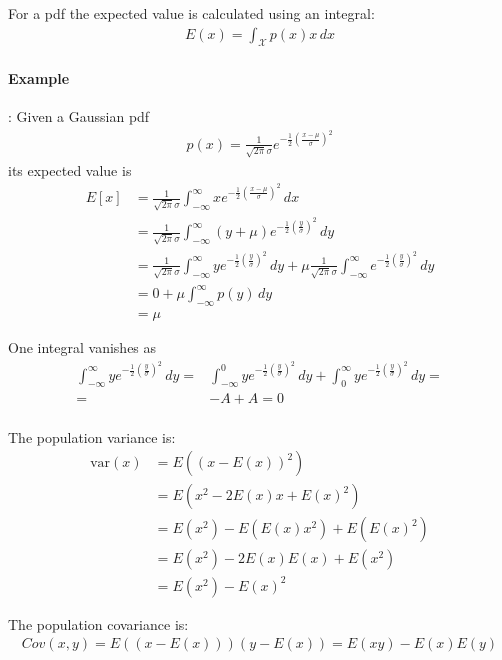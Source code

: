 For a pdf the expected value is calculated using an integral:
\begin{align}
  E(x)=\int_{\mathcal{X}}p(x)x \,dx 
\end{align}

\paragraph{Example}: Given a Gaussian pdf
\begin{align}
  p(x)= \frac{1}{\sqrt{2\pi}\sigma} e^{-\frac{1}{2}\left(\frac{x-\mu}{\sigma}\right)^2}  
\end{align}
its expected value is
\begin{align}
   E[x] &= \frac{1}{\sqrt{2\pi}\sigma}\int_{-\infty}^{\infty} x e^{-\frac{1}{2}(\frac{x-\mu}{\sigma})^2} \,dx \\
        &= \frac{1}{\sqrt{2\pi}\sigma}\int_{-\infty}^{\infty} (y+\mu) e^{-\frac{1}{2}(\frac{y}{\sigma})^2} \,dy\\
        &= \frac{1}{\sqrt{2\pi}\sigma}\int_{-\infty}^{\infty} y e^{-\frac{1}{2}(\frac{y}{\sigma})^2} \,dy + \mu \frac{1}{\sqrt{2\pi}\sigma}\int_{-\infty}^{\infty} e^{-\frac{1}{2}(\frac{y}{\sigma})^2} \,dy\\
        &= 0+\mu \int_{-\infty}^{\infty} p(y)\,dy \\
        &= \mu 
\end{align}
  
One integral vanishes as 
 \begin{align}
  \int_{-\infty}^{\infty} y e^{-\frac{1}{2}(\frac{y}{\sigma})^2} \,dy =& \int_{-\infty}^{0} y e^{-\frac{1}{2}(\frac{y}{\sigma})^2} \,dy  + \int_{0}^{\infty} y e^{-\frac{1}{2}(\frac{y}{\sigma})^2} \,dy =\\
  =& -A + A = 0\\
\end{align}

The population variance is:
\begin{align}
  \text{var}(x) &= E((x-E(x))^2) \\
         &=E(x^2 - 2E(x)x+E(x)^2)\\
         &=E(x^2)-E(E(x)x^2) + E(E(x)^2)\\
         &=E(x^2)-2E(x)E(x) + E(x^2)\\
         &=E(x^2)-E(x)^2
\end{align}
   
The population covariance is:
\begin{align}
  Cov(x,y) = E((x-E(x)))(y-E(x)) = E(xy) - E(x)E(y)
\end{align}
    
